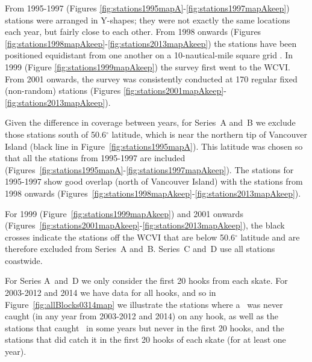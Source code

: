 From 1995-1997 (Figures
\ref{fig:stations1995mapA}-\ref{fig:stations1997mapAkeep}) stations were
arranged in Y-shapes; they were not exactly the same locations each year, but
fairly close to each other. From 1998 onwards (Figures
\ref{fig:stations1998mapAkeep}-\ref{fig:stations2013mapAkeep}) the stations have
been positioned equidistant from one another on a 10-nautical-mile square grid
\citep{fycd12}. In 1999 (Figure \ref{fig:stations1999mapAkeep}) the survey first
went to the WCVI. From 2001 onwards, the survey was consistently conducted at
170 regular fixed (non-random) stations (Figures
\ref{fig:stations2001mapAkeep}-\ref{fig:stations2013mapAkeep}).

Given the difference in coverage between years, for Series~A and~B we exclude
those stations south of 50.6$^{\circ}$ latitude, which is near the northern tip
of Vancouver Island (black line in Figure~\ref{fig:stations1995mapA}). This
latitude was chosen so that all the stations from 1995-1997 are included
(Figures~\ref{fig:stations1995mapA}-\ref{fig:stations1997mapAkeep}). The
stations for 1995-1997 show good overlap (north of Vancouver Island) with the
stations from 1998 onwards
(Figures~\ref{fig:stations1998mapAkeep}-\ref{fig:stations2013mapAkeep}).

For 1999 (Figure~\ref{fig:stations1999mapAkeep}) and 2001 onwards
(Figures~\ref{fig:stations2001mapAkeep}-\ref{fig:stations2013mapAkeep}), the
black crosses indicate the stations off the WCVI that are below 50.6$^{\circ}$
latitude and are therefore excluded from Series~A and~B. Series~C and~D use all
stations coastwide.

For Series A~and~D we only consider the first 20 hooks from each skate. For
2003-2012 and 2014 we have data for all hooks, and so in
Figure~\ref{fig:allBlocks0314map} we illustrate the stations where a \spName~was
never caught (in any year from 2003-2012 and 2014) on any hook, as well as the
stations that caught \spName~in some years but never in the first 20 hooks, and
the stations that did catch it in the first 20 hooks of each skate (for at least
one year).


